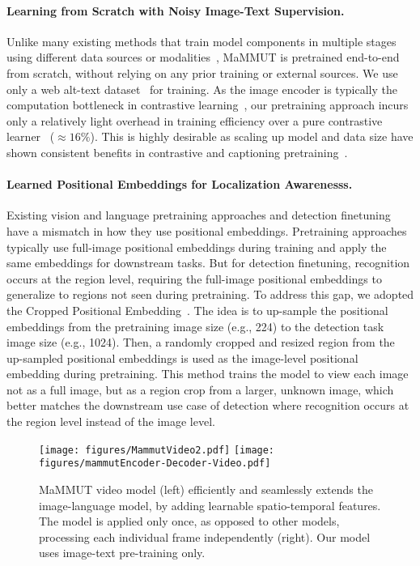 \documentclass[10pt]{article} \usepackage[accepted]{tmlr}
\newcommand{\ours}{MaMMUT\xspace}
\begin{document}
\paragraph{Learning from Scratch with Noisy Image-Text Supervision.}\quad Unlike many existing methods that train model components in multiple stages using different data sources or modalities~\citep{pali,flamingo,wang2022image,wang2022git}, \ours is pretrained end-to-end from scratch, without relying on any prior training or external sources. We use only a web alt-text dataset~\citep{align} for training. As the image encoder is typically the computation bottleneck in contrastive learning~\citep{radford2021clip}, our pretraining approach incurs only a relatively light overhead in training efficiency over a pure contrastive learner~\citep{radford2021clip} ($\approx 16\%$). This is highly desirable as scaling up model and data size have shown consistent benefits in contrastive and captioning pretraining~\citep{radford2021clip,pali,flamingo}.

\paragraph{Learned Positional Embeddings for Localization Awarenesss.}\quad
Existing vision and language pretraining approaches and detection finetuning have a mismatch in how they use positional embeddings. Pretraining approaches typically use full-image positional embeddings during training and apply the same embeddings for downstream tasks. But for detection finetuning, recognition occurs at the region level, requiring the full-image positional embeddings to generalize to regions not seen during pretraining. 
To address this gap, we adopted the Cropped Positional Embedding~\citep{rovit}. The idea is to up-sample the positional embeddings from the pretraining image size (e.g., 224) to the detection task image size (e.g., 1024). Then, a randomly cropped and resized region from the up-sampled positional embeddings is used as the image-level positional embedding during pretraining. This method trains the model to view each image not as a full image, but as a region crop from a larger, unknown image, which better matches the downstream use case of detection where recognition occurs at the region level instead of the image level.


\begin{figure}
    \centering
     \vspace{-0.7cm}
    \texttt{[image: figures/MammutVideo2.pdf]}
\hspace{0.5cm}
\texttt{[image: figures/mammutEncoder-Decoder-Video.pdf]}
     \vspace{-0.2cm}
    \caption{\ours video model (left) efficiently and seamlessly extends the image-language model, by adding learnable spatio-temporal features. The model is applied only once, as opposed to other models, processing each individual frame independently (right). Our model uses image-text pre-training only. }
    \label{fig:video_arch}
\end{figure}
\end{document}
